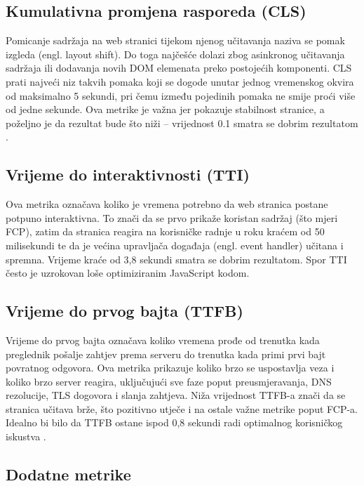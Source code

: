 \subsection{Kumulativna promjena rasporeda (CLS)}

Pomicanje sadržaja na web stranici tijekom njenog učitavanja naziva se  pomak izgleda (engl. layout shift). Do toga najčešće dolazi zbog asinkronog učitavanja sadržaja ili dodavanja novih DOM elemenata preko postojećih komponenti. CLS prati najveći niz takvih pomaka koji se dogode unutar jednog vremenskog okvira od maksimalno 5 sekundi, pri čemu između pojedinih pomaka ne smije proći više od jedne sekunde. Ova metrike je važna jer pokazuje stabilnost stranice, a poželjno je da rezultat bude što niži – vrijednost 0.1 smatra se dobrim rezultatom \cite{nordstrom2023comparison}.

\subsection{Vrijeme do interaktivnosti (TTI)}

Ova metrika označava koliko je vremena potrebno da web stranica postane potpuno interaktivna. To znači da se prvo prikaže koristan sadržaj (što mjeri FCP), zatim da stranica reagira na korisničke radnje u roku kraćem od 50 milisekundi te da je većina upravljača događaja (engl. event handler) učitana i spremna. Vrijeme kraće od 3,8 sekundi smatra se dobrim rezultatom. Spor TTI često je uzrokovan loše optimiziranim JavaScript kodom. \cite{nordstrom2023comparison}

\subsection{Vrijeme do prvog bajta (TTFB)}

Vrijeme do prvog bajta označava koliko vremena prođe od trenutka kada preglednik pošalje zahtjev prema serveru do trenutka kada primi prvi bajt povratnog odgovora. Ova metrika prikazuje koliko brzo se uspostavlja veza i koliko brzo server reagira, uključujući sve faze poput preusmjeravanja, DNS rezolucije, TLS dogovora i slanja zahtjeva. Niža vrijednost TTFB-a znači da se stranica učitava brže, što pozitivno utječe i na ostale važne metrike poput FCP-a. Idealno bi bilo da TTFB ostane ispod 0,8 sekundi radi optimalnog korisničkog iskustva \cite{pollardttfb}.

\subsection{Dodatne metrike}

